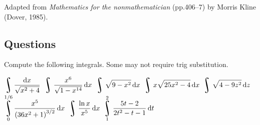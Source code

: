 \begin{flushright}
  Adapted from \textit{Mathematics for the nonmathematician} (pp.406--7) by Morris Kline (Dover, 1985).
\end{flushright}

\subsection*{Questions}
Compute the following integrals. Some may not require trig substitution.
\begin{multicols}{2}
\begin{questions}
  \question $ \displaystyle\rint \frac{\dif{x}}{\sqrt{x^2 + 4}} $
  \question $ \displaystyle\rint \frac{x^6}{\sqrt{1 - x^{14}}} \dif{x} $
  \question $ \displaystyle\rint \sqrt{9 - x^2} \dif{x} $
  \question $ \displaystyle\rint x \sqrt{25x^2 - 4} \dif{x} $
  \question $ \displaystyle\rint \sqrt{4-9z^2} \dif{z} $
  \question $ \displaystyle\rint^{1/6}_0 \frac{x^5}{\left( 36x^2 + 1 \right)^{3/2}} \dif{x} $
  \question $ \displaystyle\rint \frac{\ln x}{x^5} \dif{x} $
  \question $ \displaystyle\rint^2_1 \frac{5t - 2}{2t^2 - t - 1} \dif{t} $
\end{questions}
\end{multicols}


